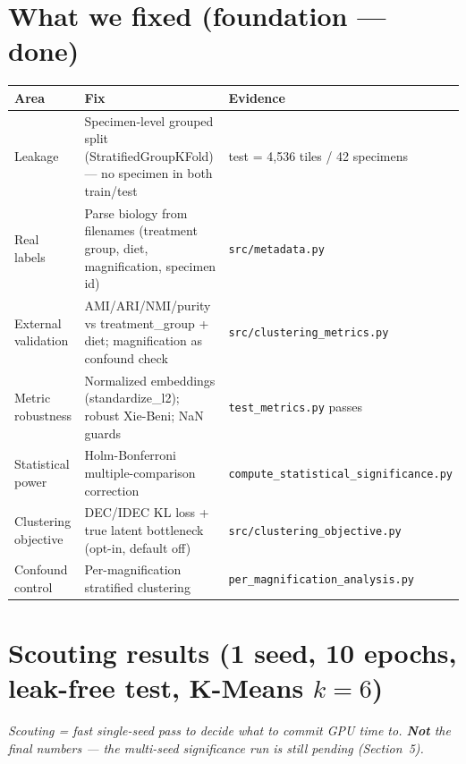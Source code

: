 \documentclass[11pt,a4paper]{article}
\begin{document}
\section{What we fixed (foundation --- done)}
\begin{center}
\begin{tabular}{@{}p{2.6cm}p{7.4cm}p{4.2cm}@{}}
\toprule
\textbf{Area} & \textbf{Fix} & \textbf{Evidence} \\
\midrule
Leakage & Specimen-level grouped split (StratifiedGroupKFold) --- no specimen in both train/test & test = 4{,}536 tiles / 42 specimens \\
Real labels & Parse biology from filenames (treatment group, diet, magnification, specimen id) & \texttt{src/metadata.py} \\
External validation & AMI/ARI/NMI/purity vs treatment\_group + diet; magnification as confound check & \texttt{src/clustering\_metrics.py} \\
Metric robustness & Normalized embeddings (standardize\_l2); robust Xie-Beni; NaN guards & \texttt{test\_metrics.py} passes \\
Statistical power & Holm-Bonferroni multiple-comparison correction & \texttt{compute\_statistical\_significance.py} \\
Clustering objective & DEC/IDEC KL loss + true latent bottleneck (opt-in, default off) & \texttt{src/clustering\_objective.py} \\
Confound control & Per-magnification stratified clustering & \texttt{per\_magnification\_analysis.py} \\
\bottomrule
\end{tabular}
\end{center}

\section{Scouting results (1 seed, 10 epochs, leak-free test, K-Means $k{=}6$)}
\emph{Scouting = fast single-seed pass to decide what to commit GPU time to. \textbf{Not} the final
numbers --- the multi-seed significance run is still pending (Section~5).}
\end{document}
